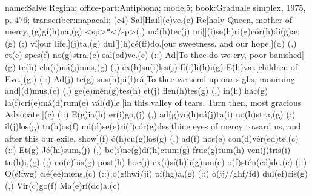 name:Salve Regina;
office-part:Antiphona;
mode:5;
book:Graduale simplex, 1975, p. 476;
transcriber:mapacali;
(c4) Sal[Hail](c)ve,(e) Re[holy Queen, mother of mercy,](g)gí(h)na,(g) <sp>*</sp>(,) má(h)ter(j) mi[](i)se(h)ri(g)cór(h)di(g)æ;(g) (;) ví[our life,](j)ta,(g) dul[](h)cé(ff)do,[our sweetness, and our hope.](d) (,) et(e) spes(f) no(g)stra,(e) sal(ed)ve.(c) (::) Ad[To thee do we cry, poor banished](g) te(h) cla(i)má(j)mus,(g) (,) éx(h)su(i)les(j) fí(i)li(h)i(g) E(h)væ.[children of Eve.](g.) (::) Ad(j) te(g) sus(h)pi(f)rá[To thee we send up our sighs, mourning and](d)mus,(e) (,) ge(e)mén(g)tes(h) et(j) flen(h)tes(g) (,) in(h) hac(g) la(f)cri(e)má(d)rum(e) vál(d)le.[in this valley of tears. Turn then, most gracious Advocate,](c) (::) E(g)ia(h) er(i)go,(j) (,) ad(g)vo(h)cá(j)ta(i) no(h)stra,(g) (;) il(j)los(g) tu(h)os(f) mi(d)se(e)ri(f)cór(g)des[thine eyes of mercy toward us, and after this our exile, show](f) ó(h)cu(g)los(g) (,) ad(f) nos(e) con(d)vér(ed)te.(c) (::) Et(g) Jé(hi)sum,(j) (,) be(i)ne(g)dí(h)ctum(g) fruc(g)tum(h) ven(j)tris(i) tu(h)i,(g) (;) no(c)bis(g) post(h) hoc(j) ex(i)sí(h)li(g)um(e) o(f)stén(ed)de.(c) (::) O(e!fwg) clé(ee)mens,(c) (::) o(g!hwi/ji) pí(hg)a,(g) (::) o(jj//ghf/fd) dul(ef)cis(g) (,) Vir(c)go(f) Ma(e)rí(dc)a.(c) 
